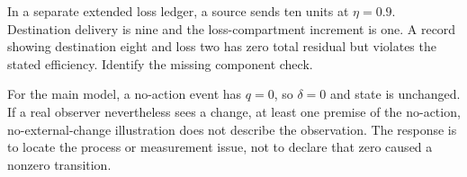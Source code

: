In a separate extended loss ledger, a source sends ten units at \(\eta=0.9\). Destination delivery is nine and the loss-compartment increment is one. A record showing destination eight and loss two has zero total residual but violates the stated efficiency. Identify the missing component check.

For the main model, a no-action event has \(q=0\), so \(\delta=0\) and state is unchanged. If a real observer nevertheless sees a change, at least one premise of the no-action, no-external-change illustration does not describe the observation. The response is to locate the process or measurement issue, not to declare that zero caused a nonzero transition.
